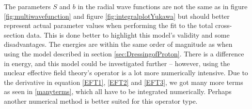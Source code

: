 The parameters $S$ and $b$ in the radial wave functions are not the same as in figure \ref{fig:multiwavefunction} and figure \ref{fig:integralplotYukawa} but should better represent actual parameter values when performing the fit to the total cross-section data. This is done better to highlight this model's validity and some disadvantages. The energies are within the same order of magnitude as when using the model described in section \ref{sec:DressingofProton}. There is a difference in energy, and this model could be investigated further -- however, using the nuclear effective field theory's operator is a lot more numerically intensive. Due to the derivative in equation \eqref{EFT1}, \eqref{EFT2} and \eqref{EFT3}, we got many more terms as seen in \eqref{manyterms}, which all have to be integrated numerically. Perhaps another numerical method is better suited for this operator type.

